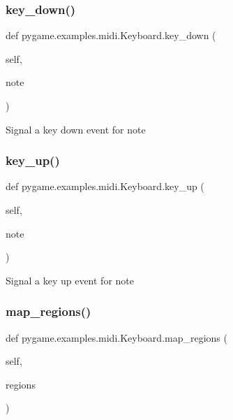 \subsubsection{\texorpdfstring{key\+\_\+down()}{key\_down()}}
{\footnotesize\ttfamily def pygame.\+examples.\+midi.\+Keyboard.\+key\+\_\+down (\begin{DoxyParamCaption}\item[{}]{self,  }\item[{}]{note }\end{DoxyParamCaption})}

\begin{DoxyVerb}Signal a key down event for note\end{DoxyVerb}
 \mbox{\label{classpygame_1_1examples_1_1midi_1_1_keyboard_a53d2e7259698cecaef8ed1488f377432}} 
\subsubsection{\texorpdfstring{key\+\_\+up()}{key\_up()}}
{\footnotesize\ttfamily def pygame.\+examples.\+midi.\+Keyboard.\+key\+\_\+up (\begin{DoxyParamCaption}\item[{}]{self,  }\item[{}]{note }\end{DoxyParamCaption})}

\begin{DoxyVerb}Signal a key up event for note\end{DoxyVerb}
 \mbox{\label{classpygame_1_1examples_1_1midi_1_1_keyboard_a6028f8e68376b4345c7ab2d6d312b086}} 
\subsubsection{\texorpdfstring{map\+\_\+regions()}{map\_regions()}}
{\footnotesize\ttfamily def pygame.\+examples.\+midi.\+Keyboard.\+map\+\_\+regions (\begin{DoxyParamCaption}\item[{}]{self,  }\item[{}]{regions }\end{DoxyParamCaption})}

